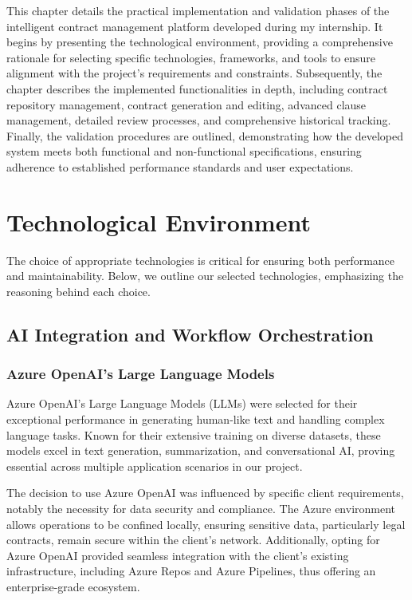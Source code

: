 This chapter details the practical implementation and validation phases of the intelligent contract management platform developed during my internship. It begins by presenting the technological environment, providing a comprehensive rationale for selecting specific technologies, frameworks, and tools to ensure alignment with the project’s requirements and constraints. Subsequently, the chapter describes the implemented functionalities in depth, including contract repository management, contract generation and editing, advanced clause management, detailed review processes, and comprehensive historical tracking. Finally, the validation procedures are outlined, demonstrating how the developed system meets both functional and non-functional specifications, ensuring adherence to established performance standards and user expectations.

\newpage
{}
\hypertarget{fourthchapter}{}

\section{Technological Environment}
The choice of appropriate technologies is critical for ensuring both performance and maintainability. Below, we outline our selected technologies, emphasizing the reasoning behind each choice.

\subsection{AI Integration and Workflow Orchestration}

\subsubsection{Azure OpenAI's Large Language Models}
Azure OpenAI's Large Language Models (LLMs) were selected for their exceptional performance in generating human-like text and handling complex language tasks. Known for their extensive training on diverse datasets, these models excel in text generation, summarization, and conversational AI, proving essential across multiple application scenarios in our project.\mynewline

The decision to use Azure OpenAI was influenced by specific client requirements, notably the necessity for data security and compliance. The Azure environment allows operations to be confined locally, ensuring sensitive data, particularly legal contracts, remain secure within the client's network. Additionally, opting for Azure OpenAI provided seamless integration with the client's existing infrastructure, including Azure Repos and Azure Pipelines, thus offering an enterprise-grade ecosystem.\mynewline

